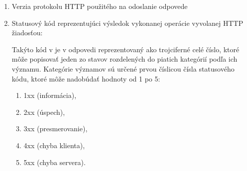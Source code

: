 \begin{enumerate}
    \item Verzia protokolu HTTP použitého na odoslanie odpovede

    \item Statusový kód reprezentujúci výsledok vykonanej operácie vyvolanej HTTP žiadosťou:

    Takýto kód v je v odpovedi reprezentovaný ako trojciferné celé číslo, ktoré môže popisovať jeden
    zo stavov rozdelených do piatich kategórií podľa ich významu. 
    Kategórie významov sú určené prvou číslicou čísla statusového kódu, ktoré môže nadobúdať hodnoty od 1 po 5:

    \begin{enumerate}
        \item 1xx (informácia),
        
        
        \item 2xx (úspech),
        
        
        \item 3xx (presmerovanie),
        
        
        \item 4xx (chyba klienta),

        
        \item 5xx (chyba servera).


\end{enumerate}
\end{enumerate}
